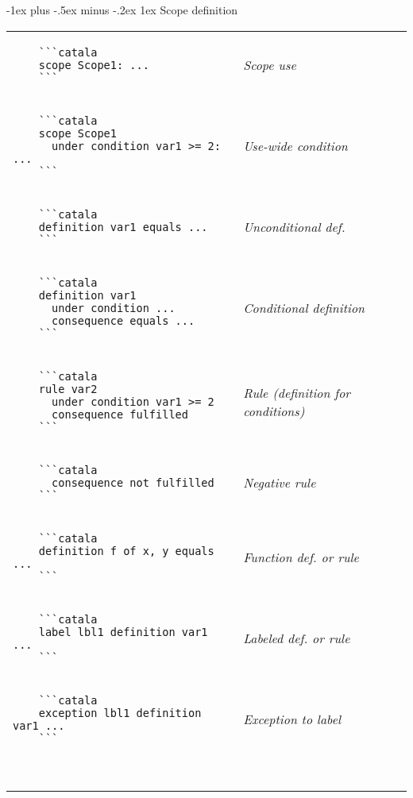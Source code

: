 \documentclass{article}
\makeatletter
\newcommand\articlenormalsize{\fontsize{10pt}{12pt}\selectfont}
\renewcommand{\section}{\@startsection{section}{1}{0mm}%
                                {-1ex plus -.5ex minus -.2ex}%
                                {1ex}%
                                {\normalfont\articlenormalsize\bfseries}}
\newenvironment{catala}{%
  \VerbatimEnvironment
  \let\FV@ListVSpace\relax
  \begin{verbatim}}%
 {\end{verbatim}}
\makeatother
\begin{document}
\begin{multicols}{3}
\columnbreak

\section{Scope definition}

\begin{tabular}{@{}p{\cola}>{\slshape}p{\colb}@{}}
  \begin{catala}
    ```catala
    scope Scope1: ...
    ```
  \end{catala}
  & Scope use
  \\
  \begin{catala}
    ```catala
    scope Scope1
      under condition var1 >= 2: ...
    ```
  \end{catala}
  & Use-wide condition
  \\
  \begin{catala}
    ```catala
    definition var1 equals ...
    ```
  \end{catala}
  & Unconditional def.
  \\
  \begin{catala}
    ```catala
    definition var1
      under condition ...
      consequence equals ...
    ```
  \end{catala}
  & Conditional definition
  \\
  \begin{catala}
    ```catala
    rule var2
      under condition var1 >= 2
      consequence fulfilled
    ```
  \end{catala}
  & Rule (definition for conditions)
  \\
  \begin{catala}
    ```catala
      consequence not fulfilled
    ```
  \end{catala}
  & Negative rule
  \\
  \begin{catala}
    ```catala
    definition f of x, y equals ...
    ```
  \end{catala}
  & Function def. or rule
  \\
  \begin{catala}
    ```catala
    label lbl1 definition var1 ...
    ```
  \end{catala}
  & Labeled def. or rule
  \\
  \begin{catala}
    ```catala
    exception lbl1 definition var1 ...
    ```
  \end{catala}
  & Exception to label
  \\
  \begin{catala}

\end{catala}
\end{tabular}
\end{multicols}
\end{document}
